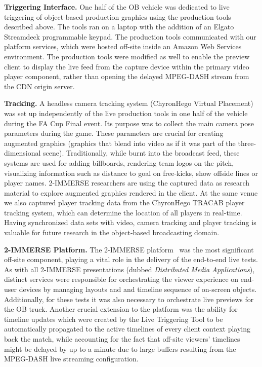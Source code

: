 \documentclass[sigchi-a]{acmart}
\begin{document}
\vspace{5pt}\noindent\textbf{Triggering Interface.} One half of the OB vehicle was dedicated to live
triggering of object-based production graphics using the production tools
described above. The tools ran on a laptop with the addition of an Elgato
Streamdeck programmable keypad. The production tools communicated with our
platform services, which were hosted off-site inside an Amazon Web Services
environment. The production tools were modified as well to enable the preview
client to display the live feed from the capture device within the primary video
player component, rather than opening the delayed MPEG-DASH stream from the CDN
origin server.

\vspace{5pt}\noindent\textbf{Tracking.} A headless camera tracking system
(ChyronHego Virtual Placement) was set up independently of the live production
tools in one half of the vehicle during the FA Cup Final event. Its purpose was
to collect the main camera pose parameters during the game. These parameters
are crucial for creating augmented graphics (graphics that blend into video as if
it was part of the three-dimensional scene). Traditionally, while burnt into
the broadcast feed, these systems are used for adding billboards, rendering
team logos on the pitch, visualizing information such as distance to goal on
free-kicks, show offside lines or player names. 2-IMMERSE researchers are using the
captured data as research material to explore augmented graphics rendered in
the client. At the same venue we also captured player tracking data from the
ChyronHego TRACAB player tracking system, which can determine the location of all
players in real-time. Having synchronized data sets with video, camera
tracking and player tracking is valuable for future research in the object-based
broadcasting domain.

\vspace{5pt}\noindent\textbf{2-IMMERSE Platform.} The 2-IMMERSE
platform~\cite{jansen2018, kegel2017} was the most significant off-site
component, playing a vital role in the delivery of the end-to-end live
tests. As with all 2-IMMERSE presentations (dubbed \emph{Distributed Media
Applications}), distinct services were responsible for orchestrating the viewer experience on
end-user devices by managing layouts and and timeline sequence of on-screen objects.
Additionally, for these tests it was also necessary to orchestrate live previews for the OB truck.
Another crucial extension to the platform was the ability for timeline updates
which were created by the Live Triggering Tool to be automatically propagated to the active timelines of every client
context playing back the match, while accounting for the fact that off-site
viewers' timelines might be delayed by up to a minute due to large buffers
resulting from the MPEG-DASH live streaming configuration.
\end{document}
